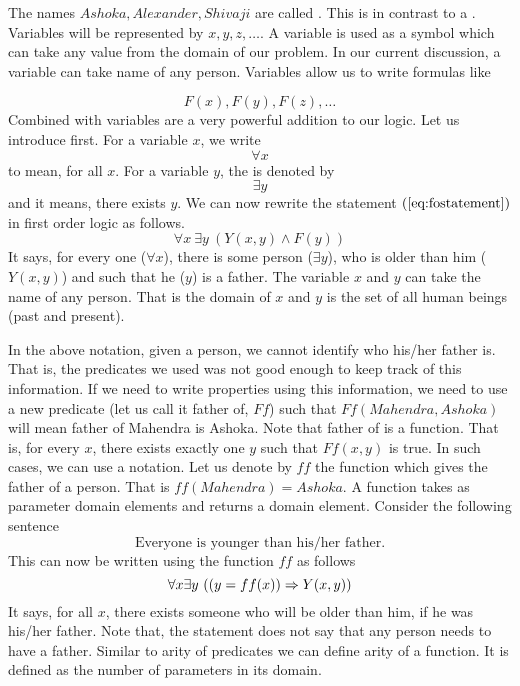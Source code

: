 The names $Ashoka, Alexander, Shivaji$ are called . This is in contrast to a . Variables will be represented by $x,y,z,\dots$. A variable is used as a symbol which can take any value from the domain of our problem. In our current discussion, a variable can take name of any person. Variables allow us to write formulas like

\[F(x), F(y), F(z), \dots\]
Combined with  variables are a very powerful addition to our logic. Let us introduce  first. For a variable $x$, we write
\[
\forall x
\]
to mean, for all $x$. For a variable $y$, the  is denoted by 
\[
\exists y
\]
and it means, there exists $y$. We can now rewrite the statement $(\ref{eq:fostatement})$ in first order logic as follows.
\[
\forall x ~\exists y ~(Y(x,y) \wedge F(y))
\]
It says, for every one ($\forall x$), there is some person ($\exists y$), who is older than him ($Y(x,y)$) and such that he ($y$) is a father. The variable $x$ and $y$ can take the name of any person. That is the domain of $x$ and $y$ is the set of all human beings (past and present). 

In the above notation, given a person, we cannot identify who his/her father is. That is, the predicates we used was not good enough to keep track of this information. If we need to write properties using this information, we need to use a new predicate (let us call it father of, $Ff$) such that $Ff(Mahendra, Ashoka)$ will mean father of Mahendra is Ashoka. Note that father of is a function. That is, for every $x$, there exists exactly one $y$ such that $Ff(x,y)$ is true. In such cases, we can use a  notation. Let us denote by $ff$ the function which gives the father of a person. That is $ff(Mahendra) = Ashoka$. A function takes as parameter domain elements and returns a domain element. Consider the following sentence
\begin{equation}
\text{Everyone is younger than his/her father.}
\end{equation}
This can now be written using the function $ff$ as follows
\[
\forall x \exists y ~((y=ff(x)) \Rightarrow Y(x,y))
\]
It says, for all $x$, there exists someone who will be older than him, if he was his/her father. Note that, the statement does not say that any person needs to have a father. Similar to arity of predicates we can define arity of a function. It is defined as the number of parameters in its domain.

